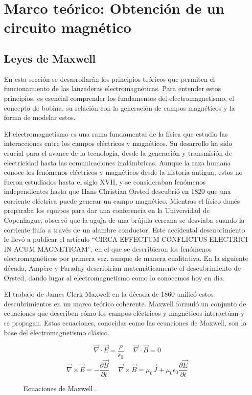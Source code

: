 \section{Marco teórico: Obtención de un circuito magnético}
\label{sec:marcoteorico}

\subsection{Leyes de Maxwell}

En esta sección se desarrollarán los principios teóricos que permiten el funcionamiento de las lanzaderas electromagnéticas. Para entender estos principios, es esencial comprender los fundamentos del electromagnetismo, el concepto de bobina, su relación con la generación de campos magnéticos y la forma de modelar estos.

El electromagnetismo es una rama fundamental de la física que estudia las interacciones entre los campos eléctricos y magnéticos. Su desarrollo ha sido crucial para el avance de la tecnología, desde la generación y transmisión de electricidad hasta las comunicaciones inalámbricas. Aunque la raza humana conoce los fenómenos eléctricos y magnéticos desde la historia antigua, estos no fueron estudiados hasta el siglo XVII, y se consideraban fenómenos independientes hasta que Hans Christian Ørsted descubrió en 1820 que una corriente eléctrica puede generar un campo magnético. Mientras el físico danés preparaba los equipos para dar una conferencia en la Universidad de Copenhague, observó que la aguja de una brújula cercana se desviaba cuando la corriente fluía a través de un alambre conductor. Este accidental descubrimiento le llevó a publicar el artículo ``CIRCA EFFECTUM CONFLICTUS ELECTRICI IN ACUM MAGNETICAM'', en el que se describieron los fenómenos electromagnéticos por primera vez, aunque de manera cualitativa. En la siguiente década, Ampère y Faraday describirían matemáticamente el descubrimiento de Ørsted, dando lugar al electromagnetismo como lo conocemos hoy en día\citep{oersted2024}.

El trabajo de James Clerk Maxwell en la década de 1860 unificó estos descubrimientos en un marco teórico coherente. Maxwell formuló un conjunto de ecuaciones que describen cómo los campos eléctricos y magnéticos interactúan y se propagan. Estas ecuaciones, conocidas como las ecuaciones de Maxwell, son la base del electromagnetismo clásico.

\begin{figure}[H]
    \centering %
    \[\vec{\nabla}\cdot \vec{E} = \frac{\rho}{\epsilon_0}~~~~~~\vec{\nabla}\cdot \vec{B} = 0\]
    \[\vec{\nabla}\times\vec{E} = -\frac{\partial\vec{B}}{\partial t}~~~~~~\vec{\nabla}\times \vec{B} = \mu_0\vec{J}+\mu_0\epsilon_0\frac{\partial \vec{E}}{\partial t}\]
    \caption{Ecuaciones de Maxwell \citep{purcell2013electricidad}.}
    \label{fig:ecuacionesMaxwell} %
\end{figure}

